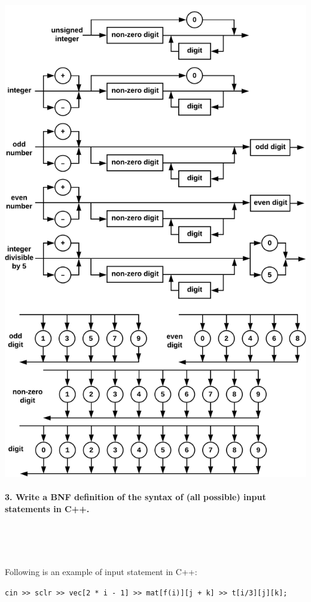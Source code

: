 \documentclass{article}
\begin{document}
		\includegraphics[width=\textwidth-2pt]{noleadingzeroescrop6}
				
	\rmfamily
	
	
	
	
	\paragraph{3. Write a BNF definition of the syntax of (all possible) input statements in C++. }\
	
	\rmfamily\
	
		Following is an example of input statement in C++:
		\newline
	
		\texttt{cin	>>	sclr	>>	vec[2 * i - 1]	>>	mat[f(i)][j + k]	>>	t[i/3][j][k]; }
	
\end{document}
